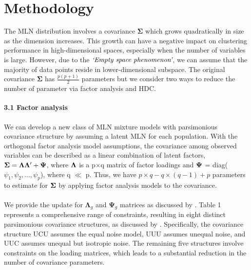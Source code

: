 \documentclass[11pt]{article}
\begin{document}
\section{Methodology} 
The MLN distribution involves a covariance $\boldsymbol{\Sigma}$ which grows quadratically in size as the dimension increases. This growth can have a negative impact on clustering performance in high-dimensional spaces, especially when the number of variables is large. \citep{bouveyron2007high} However, due to the $\emph{`Empty space phenomenon'}$, we can assume that the majority of data points reside in lower-dimensional subspace. The original covariance $\boldsymbol{\Sigma}$ has $\frac{p(p+1)}{2}$ parameters but we consider two ways to reduce the number of parameter via factor analysis and HDC.\\
\\
\textbf{3.1 Factor analysis}\\
\\
We can develop a new class of MLN mixture models with parsimonious covariance structure by assuming a latent MLN for each population. With the orthogonal factor analysis model assumptions, the covariance among observed variables can be described as a linear combination of latent factors, $\bold{\Sigma = \Lambda\Lambda'+\Psi}$, where $\bold{\Lambda}$ is a p$\times$q matrix of factor loadings and $\bold{\Psi}$ = diag($\psi_1,\psi_2, ..., \psi_p$), where q $\ll$ p. Thus, we have $p\times q - q\times(q-1)+p$ parameters to estimate for $\bold{\Sigma}$ by applying factor analysis models to the covariance. \\
\\
We provide the update for $\boldsymbol{\Lambda}_g$ and $\boldsymbol{\Psi}_g$ matrices as discussed by \citet{mcnicholas2008parsimonious}. Table 1 represents a comprehensive range of constraints, resulting in eight distinct parsimonious covariance structures, as  discussed by \cite{mcnicholas2008parsimonious}. Specifically, the covariance structure UCU assumes the equal noise model, UUU assumes unequal noise, and UUC assumes unequal but isotropic noise. The remaining five structures involve constraints on the loading matrices, which leads to a substantial reduction in the number of covariance parameters.\\
\\
\end{document}
